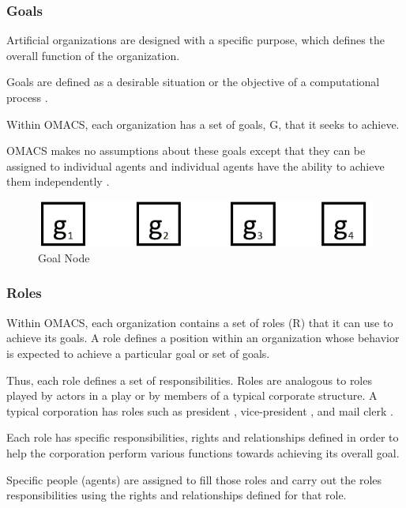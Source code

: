 \subsubsection{Goals}

Artificial organizations are designed with a specific purpose, which defines the overall function
of the organization. \cite{omacs2}

Goals are defined as a desirable situation or the objective of a
computational process .

Within OMACS, each organization has a set of goals, G, that it seeks
to achieve.

OMACS makes no assumptions about these goals except that they can be assigned to
individual agents and individual agents have the ability to achieve them independently . \cite{omacs2}
\hspace{1cm}
\begin{figure}[th]
	\centering
		\includegraphics[scale=0.5]{chapiter1/img/goals}
	\caption{\label{fig:Goal Node}Goal Node }
\end{figure}
\hspace{1cm}
\subsubsection{Roles } 

Within OMACS, each organization contains a set of roles (R) that it can use to achieve its goals.
A role defines a position within an organization whose behavior is expected to achieve a
particular goal or set of goals.\cite{omacs2}

Thus, each role defines a set of responsibilities. Roles are
analogous to roles played by actors in a play or by members of a typical corporate structure. A
typical corporation has roles such as  president ,  vice-president , and  mail clerk .  

Each role has specific responsibilities, rights and relationships defined in order to help the corporation
perform various functions towards achieving its overall goal. 

Specific people (agents) are assigned to fill those roles and carry out the roles responsibilities using the rights and
relationships defined for that role.\cite{omacs2}


